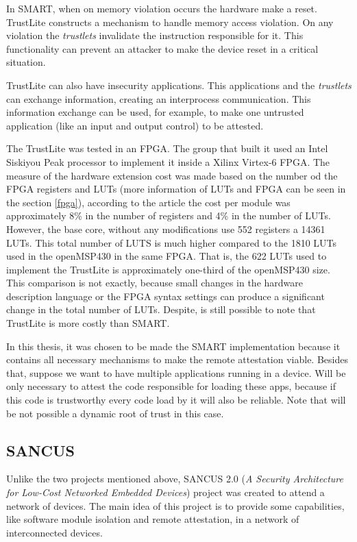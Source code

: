 In SMART, when on memory violation occurs the hardware make a reset. TrustLite constructs a mechanism to handle memory access violation. On any violation the \textit{trustlets} invalidate the instruction responsible for it. This functionality can prevent an attacker to make the device reset in a critical situation. 

TrustLite can also have insecurity applications. This applications and the \textit{trustlets} can exchange information, creating an interprocess communication. This information exchange can be used, for example, to make one untrusted application (like an input and output control) to be attested. 

The TrustLite was tested in an FPGA. The group that built it used an Intel Siskiyou Peak processor to implement it inside a Xilinx Virtex-6 FPGA. The measure of the hardware extension cost was made based on the number od the FPGA registers and LUTs (more information of LUTs and FPGA can be seen in the section \ref{fpga}), according to the article the cost per module was approximately 8\% in the number of registers and 4\% in the number of LUTs. However, the base core, without any modifications use 552 registers a 14361 LUTs. This total number of LUTS is much higher compared to the 1810 LUTs used in the openMSP430 in the same FPGA. That is, the 622 LUTs used to implement the TrustLite is approximately one-third of the openMSP430 size. This comparison is not exactly, because small changes in the hardware description language or the FPGA syntax settings can produce a significant change in the total number of LUTs. Despite, is still possible to note that TrustLite is more costly than SMART.

In this thesis, it was chosen to be made the SMART implementation because it contains all necessary mechanisms to make the remote attestation viable. Besides that, suppose we want to have multiple applications running in a device. Will be only necessary to attest the code responsible for loading these apps, because if this code is trustworthy every code load by it will also be reliable. Note that will be not possible a dynamic root of trust in this case.

\subsection{SANCUS}

Unlike the two projects mentioned above, SANCUS 2.0 (\textit{A Security Architecture for Low-Cost Networked Embedded Devices})\cite{sancus} project was created to attend a network of devices. The main idea of this project is to provide some capabilities, like software module isolation and remote attestation, in a network of interconnected devices. 

